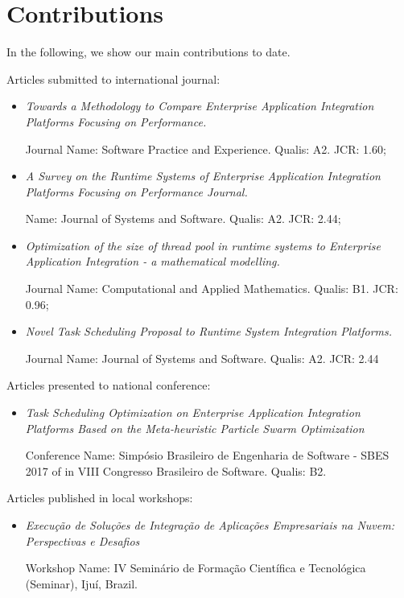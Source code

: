\section{Contributions}
\label{sec:contributions}  
\noindent

In the following, we show our main contributions to date. 
     
Articles submitted to international journal:
\begin{itemize}
\item \textit{Towards a Methodology to Compare Enterprise Application Integration Platforms Focusing on Performance.}

Journal Name: Software Practice and Experience. Qualis: A2. JCR: 1.60;
\item \textit{A Survey on the Runtime Systems of Enterprise Application Integration Platforms Focusing on Performance Journal.}

Name: Journal of Systems and Software. Qualis: A2. JCR: 2.44;
\item \textit{Optimization of the size of thread pool in runtime systems to Enterprise Application Integration - a mathematical modelling.}

Journal Name: Computational and Applied Mathematics. Qualis: B1. JCR: 0.96;
\item \textit{Novel Task Scheduling Proposal to Runtime System Integration Platforms.}

Journal Name: Journal of Systems and Software. Qualis: A2. JCR: 2.44
\end{itemize}

Articles presented to national conference:
\begin{itemize}
\item \textit{Task Scheduling Optimization on Enterprise Application Integration Platforms Based on the Meta-heuristic Particle Swarm Optimization}

Conference Name: Simpósio Brasileiro de Engenharia de Software - SBES 2017 of in VIII Congresso Brasileiro de Software. Qualis: B2.
\end{itemize}

Articles published in local workshops:
\begin{itemize}
\item \textit{Execução de Soluções de Integração de Aplicações Empresariais na Nuvem: Perspectivas e Desafios}

Workshop Name: IV Seminário de Formação Científica e Tecnológica (Seminar), Ijuí, Brazil.
\end{itemize}

